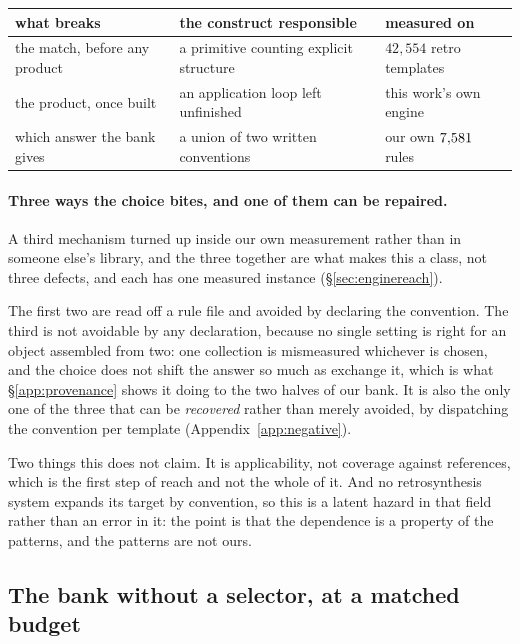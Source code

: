 \begin{center}
\footnotesize
\begin{tabular}{lll}
\toprule
what breaks & the construct responsible & measured on \\
\midrule
the match, before any product & a primitive counting explicit structure & $42{,}554$ retro templates \\
the product, once built       & an application loop left unfinished      & this work's own engine \\
which answer the bank gives   & a union of two written conventions       & our own $7{,}581$ rules \\
\bottomrule
\end{tabular}
\end{center}

\paragraph{Three ways the choice bites, and one of them can be repaired.} A third mechanism turned
up inside our own measurement rather than in someone else's library, and the three together are
what makes this a class, not three defects, and each has one measured instance
(\S\ref{sec:enginereach}).

The first two are read off a rule file and avoided by declaring the convention. The third is not
avoidable by any declaration, because no single setting is right for an object assembled from two:
one collection is mismeasured whichever is chosen, and the choice does not shift the answer so much
as exchange it, which is what \S\ref{app:provenance} shows it doing to the two halves of our bank.
It is also the only one of the three that can be \emph{recovered} rather than merely avoided, by
dispatching the convention per template (Appendix~\ref{app:negative}).

Two things this does not claim. It is applicability, not coverage against references, which
is the first step of reach and not the whole of it. And no retrosynthesis system expands its target
by convention, so this is a latent hazard in that field rather than an error in it: the point is
that the dependence is a property of the patterns, and the patterns are not ours.

\subsection{The bank without a selector, at a matched budget}
\label{app:noselect}

